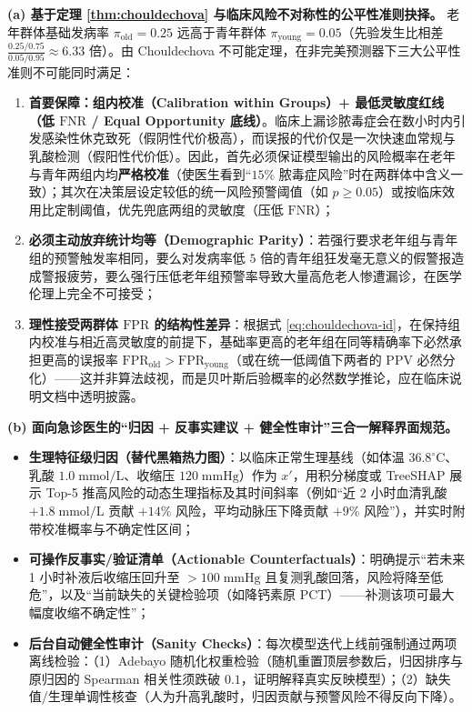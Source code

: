 \textbf{(a) 基于定理 \ref{thm:chouldechova} 与临床风险不对称性的公平性准则抉择。}
老年群体基础发病率 $\pi_{\text{old}} = 0.25$ 远高于青年群体 $\pi_{\text{young}} = 0.05$（先验发生比相差 $\frac{0.25/0.75}{0.05/0.95} \approx 6.33$ 倍）。由 Chouldechova 不可能定理，在非完美预测器下三大公平性准则不可能同时满足：
\begin{enumerate}
  \item \textbf{首要保障：组内校准（Calibration within Groups）+ 最低灵敏度红线（低 $\mathrm{FNR}$ / Equal Opportunity 底线）}。临床上漏诊脓毒症会在数小时内引发感染性休克致死（假阴性代价极高），而误报的代价仅是一次快速血常规与乳酸检测（假阳性代价低）。因此，首先必须保证模型输出的风险概率在老年与青年两组内均\textbf{严格校准}（使医生看到“$15\%$ 脓毒症风险”时在两群体中含义一致）；其次在决策层设定较低的统一风险预警阈值（如 $p \ge 0.05$）或按临床效用比定制阈值，优先兜底两组的灵敏度（压低 $\mathrm{FNR}$）；
  \item \textbf{必须主动放弃统计均等（Demographic Parity）}：若强行要求老年组与青年组的预警触发率相同，要么对发病率低 $5$ 倍的青年组狂发毫无意义的假警报造成警报疲劳，要么强行压低老年组预警率导致大量高危老人惨遭漏诊，在医学伦理上完全不可接受；
  \item \textbf{理性接受两群体 $\mathrm{FPR}$ 的结构性差异}：根据式 \eqref{eq:chouldechova-id}，在保持组内校准与相近高灵敏度的前提下，基础率更高的老年组在同等精确率下必然承担更高的误报率 $\mathrm{FPR}_{\text{old}} > \mathrm{FPR}_{\text{young}}$（或在统一低阈值下两者的 $\mathrm{PPV}$ 必然分化）——这并非算法歧视，而是贝叶斯后验概率的必然数学推论，应在临床说明文档中透明披露。
\end{enumerate}

\textbf{(b) 面向急诊医生的“归因 + 反事实建议 + 健全性审计”三合一解释界面规范。}
\begin{itemize}
  \item \textbf{生理特征级归因（替代黑箱热力图）}：以临床正常生理基线（如体温 $36.8^\circ\text{C}$、乳酸 $1.0\;\mathrm{mmol/L}$、收缩压 $120\;\mathrm{mmHg}$）作为 $x'$，用积分梯度或 TreeSHAP 展示 Top-5 推高风险的动态生理指标及其时间斜率（例如“近 2 小时血清乳酸 $+1.8\;\mathrm{mmol/L}$ 贡献 $+14\%$ 风险，平均动脉压下降贡献 $+9\%$ 风险”），并实时附带校准概率与不确定性区间；
  \item \textbf{可操作反事实/验证清单（Actionable Counterfactuals）}：明确提示“若未来 1 小时补液后收缩压回升至 $> 100\;\mathrm{mmHg}$ 且复测乳酸回落，风险将降至低危”，以及“当前缺失的关键检验项（如降钙素原 PCT）——补测该项可最大幅度收缩不确定性”；
  \item \textbf{后台自动健全性审计（Sanity Checks）}：每次模型迭代上线前强制通过两项离线检验：（1）Adebayo 随机化权重检验（随机重置顶层参数后，归因排序与原归因的 Spearman 相关性须跌破 $0.1$，证明解释真实反映模型）；（2）缺失值/生理单调性核查（人为升高乳酸时，归因贡献与预警风险不得反向下降）。
\end{itemize}

